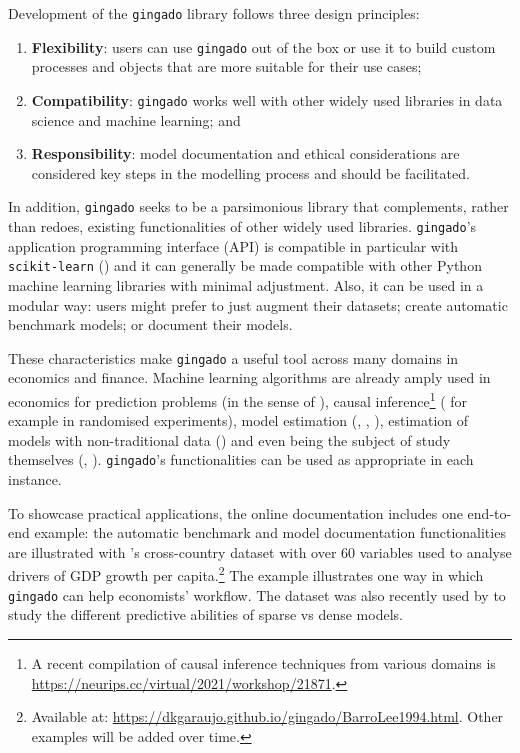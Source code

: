 \documentclass{article}
\begin{document}
Development of the \texttt{gingado} library follows three design principles:
\begin{enumerate}
    \item \textbf{Flexibility}: users can use \texttt{gingado} out of the box or use it to build custom processes and objects that are more suitable for their use cases;
    \item \textbf{Compatibility}: \texttt{gingado} works well with other widely used libraries in data science and machine learning; and
    \item \textbf{Responsibility}: model documentation and ethical considerations are considered key steps in the modelling process and should be facilitated.
\end{enumerate}
In addition, \texttt{gingado} seeks to be a parsimonious library that complements, rather than redoes, existing functionalities of other widely used libraries. \texttt{gingado}'s application programming interface (API) is compatible in particular with \texttt{scikit-learn} (\cite{scikit-learn}) and it can generally be made compatible with other Python machine learning libraries with minimal adjustment. Also, it can be used in a modular way: users might prefer to just augment their datasets; create automatic benchmark models; or document their models.

These characteristics make \texttt{gingado} a useful tool across many domains in economics and finance. Machine learning algorithms are already amply used in economics for prediction problems (in the sense of \cite{PredictionProblems}), causal inference\footnote{A recent compilation of causal inference techniques from various domains is \url{https://neurips.cc/virtual/2021/workshop/21871}.} (\cite{chernozhukov2018generic} for example in randomised experiments), model estimation (\cite{maliar2021deep}, \cite{fernandez2019financial}, \cite{duarte2018machine}), estimation of models with non-traditional data (\cite{ferreira2021forecasting}) and even being the subject of study themselves (\cite{predunequal}, \cite{giannone2021illusion}). \texttt{gingado}'s functionalities can be used as appropriate in each instance.

To showcase practical applications, the online documentation includes one end-to-end example: the automatic benchmark and model documentation functionalities are illustrated with \cite{BARRO19941}'s cross-country dataset with over 60 variables used to analyse drivers of GDP growth per capita.\footnote{Available at: \url{https://dkgaraujo.github.io/gingado/BarroLee1994.html}. Other examples will be added over time.} The example illustrates one way in which \texttt{gingado} can help economists' workflow. The dataset was also recently used by \cite{giannone2021illusion} to study the different predictive abilities of sparse vs dense models.
\end{document}
